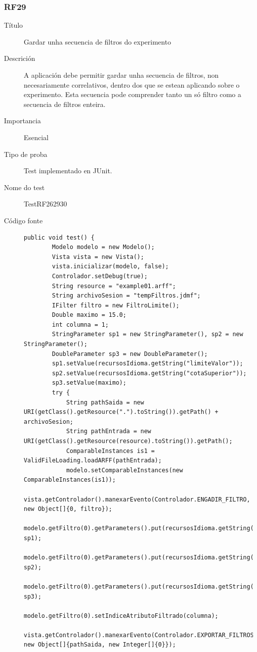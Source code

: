 \subsubsection*{RF29}
\begin{description}
\item[Título] \hfill
Gardar unha secuencia de filtros do experimento
\item[Descrición] \hfill
A aplicación debe permitir gardar unha secuencia de filtros, non necesariamente correlativos, dentro dos que se estean aplicando sobre o experimento. Esta secuencia pode comprender tanto un só filtro como a secuencia de filtros enteira.
\item[Importancia] \hfill
Esencial
\item[Tipo de proba] \hfill
Test implementado en JUnit.
\item[Nome do test] \hfill
TestRF262930
\item[Código fonte]
\begin{lstlisting}
public void test() {
        Modelo modelo = new Modelo();
        Vista vista = new Vista();
        vista.inicializar(modelo, false);
        Controlador.setDebug(true);
        String resource = "example01.arff";
        String archivoSesion = "tempFiltros.jdmf";
        IFilter filtro = new FiltroLimite();
        Double maximo = 15.0;
        int columna = 1;
        StringParameter sp1 = new StringParameter(), sp2 = new StringParameter();
        DoubleParameter sp3 = new DoubleParameter();
        sp1.setValue(recursosIdioma.getString("limiteValor"));
        sp2.setValue(recursosIdioma.getString("cotaSuperior"));
        sp3.setValue(maximo);
        try {
            String pathSaida = new URI(getClass().getResource(".").toString()).getPath() + archivoSesion;
            String pathEntrada = new URI(getClass().getResource(resource).toString()).getPath();
            ComparableInstances is1 = ValidFileLoading.loadARFF(pathEntrada);
            modelo.setComparableInstances(new ComparableInstances(is1));
            vista.getControlador().manexarEvento(Controlador.ENGADIR_FILTRO, new Object[]{0, filtro});
            modelo.getFiltro(0).getParameters().put(recursosIdioma.getString("tipoLimite"), sp1);
            modelo.getFiltro(0).getParameters().put(recursosIdioma.getString("tipoCota"), sp2);
            modelo.getFiltro(0).getParameters().put(recursosIdioma.getString("valor"), sp3);
            modelo.getFiltro(0).setIndiceAtributoFiltrado(columna);
            vista.getControlador().manexarEvento(Controlador.EXPORTAR_FILTROS, new Object[]{pathSaida, new Integer[]{0}});

\end{lstlisting}
\end{description}
